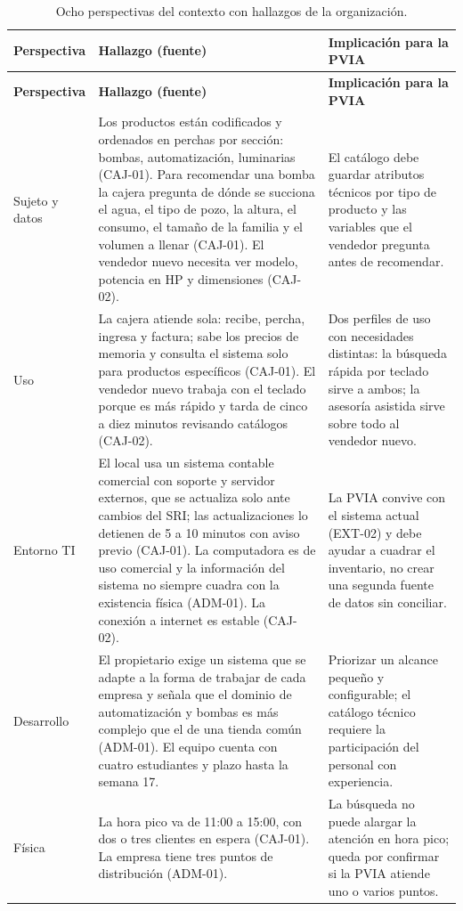 \small
\begin{longtable}{@{}L{2.2cm}L{6.6cm}L{4.9cm}@{}}
\caption{Ocho perspectivas del contexto con hallazgos de la organización.}\label{tab:perspectivas}\\
\toprule
\textbf{Perspectiva} & \textbf{Hallazgo (fuente)} & \textbf{Implicación para la PVIA} \\
\midrule
\endfirsthead
\toprule
\textbf{Perspectiva} & \textbf{Hallazgo (fuente)} & \textbf{Implicación para la PVIA} \\
\midrule
\endhead
\bottomrule
\endfoot
Sujeto y datos & Los productos están codificados y ordenados en perchas por sección: bombas, automatización, luminarias (CAJ-01). Para recomendar una bomba la cajera pregunta de dónde se succiona el agua, el tipo de pozo, la altura, el consumo, el tamaño de la familia y el volumen a llenar (CAJ-01). El vendedor nuevo necesita ver modelo, potencia en HP y dimensiones (CAJ-02). & El catálogo debe guardar atributos técnicos por tipo de producto y las variables que el vendedor pregunta antes de recomendar. \\
Uso & La cajera atiende sola: recibe, percha, ingresa y factura; sabe los precios de memoria y consulta el sistema solo para productos específicos (CAJ-01). El vendedor nuevo trabaja con el teclado porque es más rápido y tarda de cinco a diez minutos revisando catálogos (CAJ-02). & Dos perfiles de uso con necesidades distintas: la búsqueda rápida por teclado sirve a ambos; la asesoría asistida sirve sobre todo al vendedor nuevo. \\
Entorno TI & El local usa un sistema contable comercial con soporte y servidor externos, que se actualiza solo ante cambios del SRI; las actualizaciones lo detienen de 5 a 10 minutos con aviso previo (CAJ-01). La computadora es de uso comercial y la información del sistema no siempre cuadra con la existencia física (ADM-01). La conexión a internet es estable (CAJ-02). & La PVIA convive con el sistema actual (EXT-02) y debe ayudar a cuadrar el inventario, no crear una segunda fuente de datos sin conciliar. \\
Desarrollo & El propietario exige un sistema que se adapte a la forma de trabajar de cada empresa y señala que el dominio de automatización y bombas es más complejo que el de una tienda común (ADM-01). El equipo cuenta con cuatro estudiantes y plazo hasta la semana 17. & Priorizar un alcance pequeño y configurable; el catálogo técnico requiere la participación del personal con experiencia. \\
Física & La hora pico va de 11:00 a 15:00, con dos o tres clientes en espera (CAJ-01). La empresa tiene tres puntos de distribución (ADM-01). & La búsqueda no puede alargar la atención en hora pico; queda por confirmar si la PVIA atiende uno o varios puntos. \\

\end{longtable}
